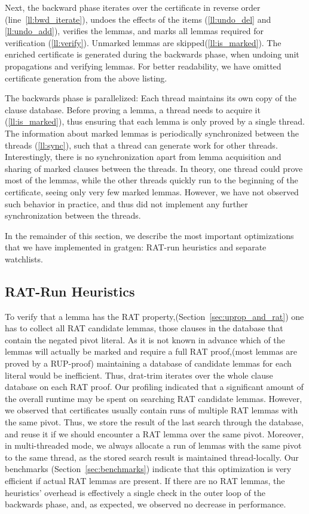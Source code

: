 \documentclass[smallcondensed]{svjour3}     %
\begin{document}
Next, the backward phase iterates over the certificate in reverse order (line~\ref{ll:bwd_iterate}), undoes the effects of the items (\ref{ll:undo_del} and \ref{ll:undo_add}), verifies the lemmas, and marks all lemmas required for verification (\ref{ll:verify}). Unmarked lemmas are skipped(\ref{ll:is_marked}).
The enriched certificate is generated during the backwards phase, when undoing unit propagations and verifying lemmas. 
For better readability, we have omitted certificate generation from the above listing.

The backwards phase is parallelized: Each thread maintains its own copy of the clause database. 
Before proving a lemma, a thread needs to acquire it (\ref{ll:is_marked}), thus ensuring that each lemma is only proved by a single thread.
The information about marked lemmas is periodically synchronized between the threads (\ref{ll:sync}), such that a thread can generate work for other threads.
Interestingly, there is no synchronization apart from lemma acquisition and sharing of marked clauses between the 
threads. In theory, one thread could prove most of the lemmas, while the other threads quickly run to the beginning of the certificate, 
seeing only very few marked lemmas. However, we have not observed such behavior in practice, and thus did not implement any further synchronization
between the threads.

In the remainder of this section, we describe the most important optimizations that we have implemented in gratgen: RAT-run heuristics and separate watchlists.

\subsection{RAT-Run Heuristics}
To verify that a lemma has the RAT property,(\cf Section~\ref{sec:uprop_and_rat}) one has to collect all RAT candidate lemmas, \ie those clauses in the 
database that contain the negated pivot literal. As it is not known in advance which of the lemmas will
actually be marked and require a full RAT proof,(most lemmas are proved by a RUP-proof) maintaining a database of candidate 
lemmas for each literal would be inefficient. Thus, drat-trim iterates over the whole clause database on each RAT proof. Our profiling indicated that a significant amount of the overall runtime may be spent on searching RAT candidate lemmas. However, we observed that certificates
usually contain runs of multiple RAT lemmas with the same pivot. Thus, we store the result of the last search through the database, and reuse it if 
we should encounter a RAT lemma over the same pivot. Moreover, in multi-threaded mode, we always allocate a run of lemmas with the same pivot to the 
same thread, as the stored search result is maintained thread-locally. Our benchmarks (Section~\ref{sec:benchmarks}) indicate that this optimization is very efficient if actual RAT lemmas are present. If there are no RAT lemmas, the heuristics' overhead is effectively a single check in the outer loop
of the backwards phase, and, as expected, we observed no decrease in performance.
\end{document}
